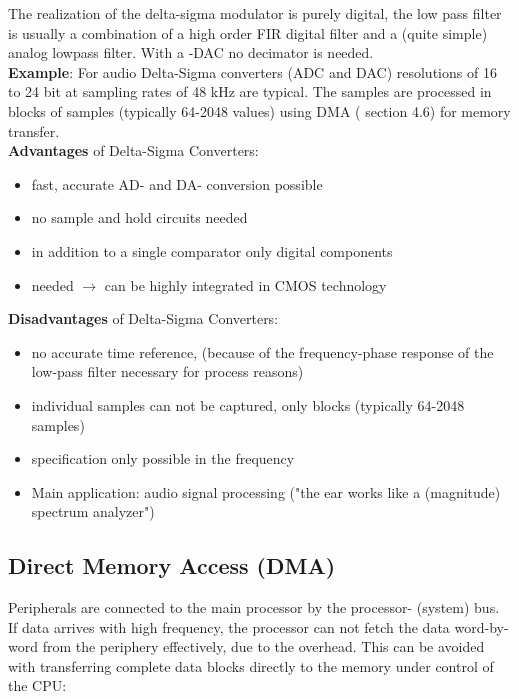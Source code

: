 The realization of the delta-sigma modulator is purely digital, the low pass filter is usually a combination of a high order FIR digital filter and a (quite simple) analog lowpass filter. With a -DAC no decimator is needed.\\

\textbf{Example}: For audio Delta-Sigma converters (ADC and DAC) resolutions of 16 to 24 bit at  sampling rates of 48 kHz are typical. The samples are processed in blocks of samples (typically 64-2048 values) using DMA ( section  4.6) for memory transfer.\\

\textbf{Advantages } of Delta-Sigma Converters:

\begin{itemize}
\item  fast, accurate AD- and DA- conversion possible
\item  no sample and hold circuits needed
\item  in addition to a single comparator only digital components
\item needed $\rightarrow$ can be highly integrated in CMOS technology
\end{itemize}

\textbf{Disadvantages } of Delta-Sigma Converters:

\begin{itemize}
\item  no accurate time reference, (because of the frequency-phase response of the low-pass filter necessary for process reasons)
\item  individual samples can not be captured, only blocks (typically 64-2048 samples)
\item  specification only possible in the frequency
\item  Main application: audio signal processing ("the ear works like a (magnitude) spectrum analyzer")
\end{itemize}

\subsection{Direct Memory Access (DMA)}

Peripherals are connected to the main processor by the processor- (system) bus. If data arrives with high frequency, the processor can not fetch the data word-by-word from the periphery effectively, due to the overhead. This can be avoided with transferring complete data blocks directly to the memory under control of the CPU:\\

